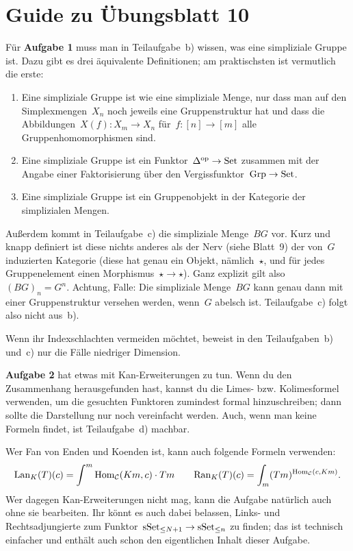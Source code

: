 \documentclass{uebblatt}
\begin{document}
\section*{Guide zu Übungsblatt 10}

Für \textbf{Aufgabe 1} muss man in Teilaufgabe~b) wissen, was eine simpliziale
Gruppe ist. Dazu gibt es drei äquivalente Definitionen; am praktischsten ist
vermutlich die erste:
\begin{enumerate}
\item Eine simpliziale Gruppe ist wie eine simpliziale Menge, nur dass man auf
den Simplexmengen~$X_n$ noch jeweils eine Gruppenstruktur hat und dass die
Abbildungen~$X(f) : X_m \to X_n$ für~$f : [n] \to [m]$ alle
Gruppenhomomorphismen sind.
\item Eine simpliziale Gruppe ist ein Funktor~$\Delta^{\mathrm{op}} \to \mathrm{Set}$ zusammen
mit der Angabe einer Faktorisierung über den Vergissfunktor~$\mathrm{Grp} \to \mathrm{Set}$.
\item Eine simpliziale Gruppe ist ein Gruppenobjekt in der Kategorie der
simplizialen Mengen.
\end{enumerate}

Außerdem kommt in Teilaufgabe~c) die simpliziale Menge~$BG$ vor. Kurz und knapp
definiert ist diese nichts anderes als der Nerv (siehe Blatt~9) der von~$G$
induzierten Kategorie (diese hat genau ein Objekt, nämlich~$\star$, und für
jedes Gruppenelement einen Morphismus~$\star \to \star$). Ganz explizit gilt
also~$(BG)_n = G^n$. Achtung, Falle: Die simpliziale Menge~$BG$ kann genau dann
mit einer Gruppenstruktur versehen werden, wenn~$G$ abelsch ist. Teilaufgabe~c)
folgt also nicht aus~b).

Wenn ihr Indexschlachten vermeiden möchtet, beweist in den Teilaufgaben~b)
und~c) nur die Fälle niedriger Dimension.

\textbf{Aufgabe 2} hat etwas mit Kan-Erweiterungen zu tun. Wenn du den
Zusammenhang herausgefunden hast, kannst du die Limes- bzw. Kolimesformel
verwenden, um die gesuchten Funktoren zumindest formal hinzuschreiben; dann
sollte die Darstellung nur noch vereinfacht werden. Auch, wenn man keine
Formeln findet, ist Teilaufgabe~d) machbar.

Wer Fan von Enden und Koenden ist, kann auch folgende Formeln verwenden:
\[ \mathrm{Lan}_K(T)(c) = \int^m \mathrm{Hom}_{\mathcal{C}}(Km,c) \cdot Tm \qquad
  \mathrm{Ran}_K(T)(c) = \int_m (Tm)^{\mathrm{Hom}_{\mathcal{C}}(c,Km)}. \]
Wer dagegen Kan-Erweiterungen nicht mag, kann die Aufgabe natürlich auch
ohne sie bearbeiten. Ihr könnt es auch dabei belassen, Links- und
Rechtsadjungierte zum Funktor~$\mathrm{sSet}_{\leq N+1} \to \mathrm{sSet}_{\leq n}$ zu finden;
das ist technisch einfacher und enthält auch schon den eigentlichen Inhalt
dieser Aufgabe.
\end{document}
